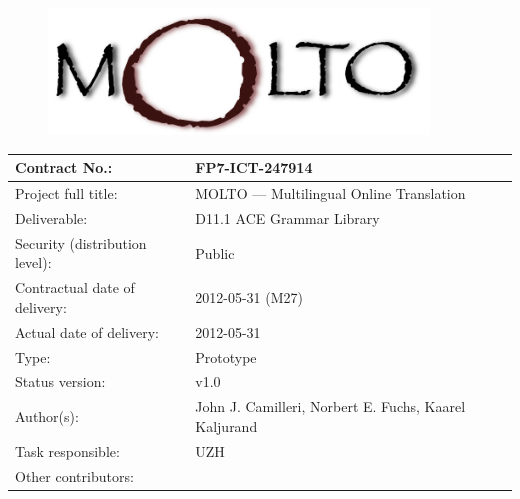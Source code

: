 \thispagestyle{empty}
\begin{figure}[t]
\centering
\includegraphics[width=0.9\textwidth]{molto_logo}
\end{figure}

\begin{center}
\begin{tabular}{ | l | l | }
\hline
Contract No.: & FP7-ICT-247914 \\
\hline
Project full title: & MOLTO --- Multilingual Online Translation \\
\hline
Deliverable: & D11.1 ACE Grammar Library \\
\hline
Security (distribution level): & Public \\
\hline
Contractual date of delivery: & 2012-05-31 (M27) \\
\hline
Actual date of delivery: & 2012-05-31 \\
\hline
Type: & Prototype \\
\hline
Status version: & v1.0 \\
\hline
Author(s): & John J. Camilleri, Norbert E. Fuchs, Kaarel Kaljurand \\
\hline
Task responsible: & UZH \\
\hline
Other contributors: & \\
\hline
\end{tabular}
\end{center}
